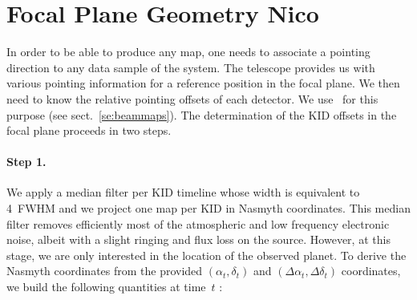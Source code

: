 %
%
%

\section{Focal Plane Geometry {\color{YellowGreen} Nico}}
\label{se:fov_geometry}



In order to be able to produce any map, one needs to associate a pointing
direction to any data sample of the system. The telescope provides us with
various pointing information for a reference position in the focal plane. We
then need to know the relative pointing offsets of each detector. We use
\bms\ for this purpose (see sect.~\ref{se:beammaps}). The determination of the
KID offsets in the focal plane proceeds in two steps.

\paragraph{Step 1.} We apply a median filter per
KID timeline whose width is equivalent to 4~FWHM and we project one
map per KID in Nasmyth coordinates. This median filter removes
efficiently most of the atmospheric and low frequency electronic
noise, albeit with a slight ringing and flux loss on the
source. However, at this stage, we are only interested in the location
of the observed planet. To derive the Nasmyth coordinates from the
provided $(\alpha_t,\delta_t)$ and $(\Delta\alpha_t,\Delta\delta_t)$
coordinates, we build the following quantities at time~$t$ :


